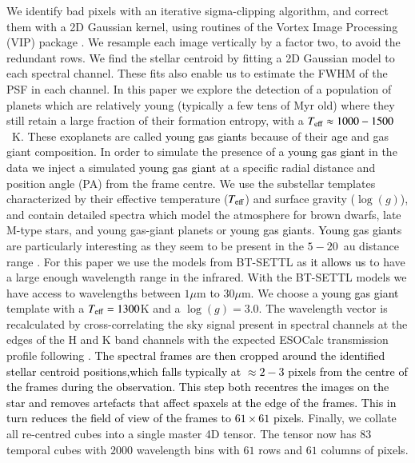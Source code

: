 \documentclass{aa}
\newcommand{\newchange}[1]{\textcolor{black}{#1}}
\begin{document}
We identify bad pixels with an iterative sigma-clipping algorithm, and correct them with a 2D Gaussian kernel, using routines of the Vortex Image Processing (\textsc{VIP}) package \citep{2017AJGomezVIP,2023Christiaens}.
We resample each image vertically by a factor two, to avoid the redundant rows. 
We find the stellar centroid by fitting a 2D Gaussian model to each spectral channel. 
These fits also enable us to estimate the FWHM of the PSF in each channel. 
In this paper we explore the detection of a population of planets which are relatively young (typically a few tens of Myr old) where they still retain a large fraction of their formation entropy, with a $T_{\rm eff}\approx 1000 - 1500$~K.
These exoplanets are called \newchange{young gas giant}s because of their \newchange{age} and gas giant composition.
In order to simulate the presence of a \newchange{young gas giant} in the data we inject a simulated \newchange{young gas giant} at a specific radial distance and position angle (PA) from the frame centre.
We use the substellar templates characterized by their effective temperature ($T_{\rm{eff}}$) and surface gravity ($\log(g)$), and contain detailed spectra which model the atmosphere for brown dwarfs, late M-type stars, and young gas-giant planets or \newchange{young gas giant}s.
\newchange{Young gas giant}s are particularly interesting as they seem to be present in the $5-20$~au distance range \cite{2016Bryan}.
For this paper we use the models from BT-SETTL as \newchange{it allows us} to have a large enough wavelength range in the infrared. 
With the BT-SETTL models we have access to wavelengths between $1\mu$m to $30\mu$m.
We choose a \newchange{young gas giant} template with a $T_{\rm eff} = 1300$K and a $\log(g)=3.0$.
The wavelength vector is recalculated by cross-correlating the sky signal present in spectral channels at the edges of the H and K band channels with the expected ESOCalc transmission profile following \cite{2018AHoeijmakersMM}. 
\newchange{The spectral frames are then cropped around the identified stellar centroid positions,which falls typically at $\approx 2-3$ pixels from the centre of the frames during the observation. This step both recentres the images on the star and removes artefacts that affect spaxels at the edge of the frames.
This in turn reduces the field of view of the frames to $61\times61$ pixels.}
Finally, we collate all re-centred cubes into a single master 4D tensor.
The tensor now has $83$ temporal cubes with $2000$ wavelength bins with $61$ rows and $61$ columns of pixels.
\end{document}
